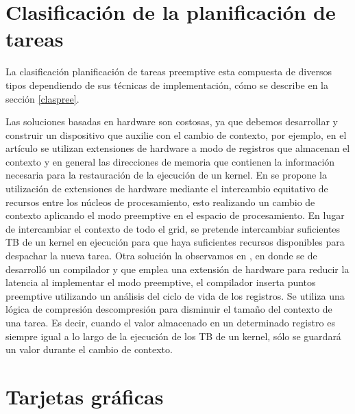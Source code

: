 \section{Clasificación de la planificación de tareas}

La clasificación planificación de tareas preemptive esta compuesta de diversos tipos dependiendo de sus técnicas de implementación, cómo se describe en la sección \ref{claspree}. 

Las soluciones basadas en hardware son costosas, ya que debemos desarrollar y construir un dispositivo que auxilie con el cambio de contexto, por ejemplo, en el artículo \cite{18} se utilizan extensiones de hardware a modo de registros que almacenan el contexto y en general las direcciones de memoria que contienen la información necesaria para la restauración de la ejecución de un kernel. En \cite{20} se propone la utilización de extensiones de hardware mediante el intercambio equitativo de recursos entre los núcleos de procesamiento, esto realizando un cambio de contexto aplicando el modo preemptive en el espacio de procesamiento. En lugar de intercambiar el contexto de todo el grid, se pretende intercambiar suficientes TB de un kernel en ejecución para que haya suficientes recursos disponibles para despachar la nueva tarea. Otra solución la observamos en , en donde se de desarrolló un compilador y que emplea una extensión de hardware para reducir la latencia al implementar el modo preemptive, el compilador inserta puntos preemptive utilizando un análisis del ciclo de vida de los registros. Se utiliza una lógica de compresión descompresión para disminuir el tamaño del contexto de una tarea. Es decir, cuando el valor almacenado en un determinado registro es siempre igual a lo largo de la ejecución de los TB de un kernel, sólo se guardará un valor durante el cambio de contexto.

\section{Tarjetas gráficas}

